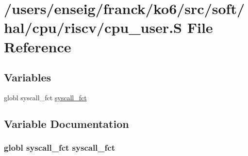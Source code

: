 \hypertarget{riscv_2cpu__user_8S}{\section{/users/enseig/franck/ko6/src/soft/hal/cpu/riscv/cpu\-\_\-user.S File Reference}
\label{riscv_2cpu__user_8S}
}
\subsection*{Variables}
\begin{DoxyCompactItemize}
\item 
globl syscall\-\_\-fct \hyperlink{riscv_2cpu__user_8S_a2824a7b580dd3afd46068b42af360fa6}{syscall\-\_\-fct}
\end{DoxyCompactItemize}


\subsection{Variable Documentation}
\hypertarget{riscv_2cpu__user_8S_a2824a7b580dd3afd46068b42af360fa6}{
\subsubsection[{syscall\-\_\-fct}]{\setlength{\rightskip}{0pt plus 5cm}globl syscall\-\_\-fct syscall\-\_\-fct}}\label{riscv_2cpu__user_8S_a2824a7b580dd3afd46068b42af360fa6}
